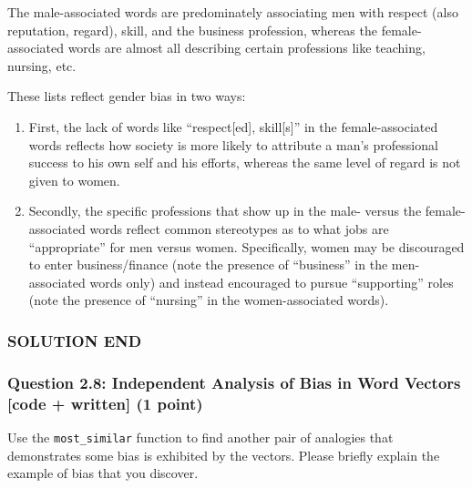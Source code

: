 \documentclass[11pt]{article}
\begin{document}
The male-associated words are predominately associating men with respect
(also reputation, regard), skill, and the business profession, whereas
the female-associated words are almost all describing certain
professions like teaching, nursing, etc.

These lists reflect gender bias in two ways:

\begin{enumerate}
\def\labelenumi{\arabic{enumi}.}
\item
  First, the lack of words like ``respect{[}ed{]}, skill{[}s{]}'' in the
  female-associated words reflects how society is more likely to
  attribute a man's professional success to his own self and his
  efforts, whereas the same level of regard is not given to women.
\item
  Secondly, the specific professions that show up in the male- versus
  the female-associated words reflect common stereotypes as to what jobs
  are ``appropriate'' for men versus women. Specifically, women may be
  discouraged to enter business/finance (note the presence of
  ``business'' in the men-associated words only) and instead encouraged
  to pursue ``supporting'' roles (note the presence of ``nursing'' in
  the women-associated words).
\end{enumerate}

\hypertarget{solution-end}{%
\subsubsection{SOLUTION END}\label{solution-end}}

    \hypertarget{question-2.8-independent-analysis-of-bias-in-word-vectors-code-written-1-point}{%
\subsubsection{Question 2.8: Independent Analysis of Bias in Word
Vectors {[}code + written{]} (1
point)}\label{question-2.8-independent-analysis-of-bias-in-word-vectors-code-written-1-point}}

Use the \texttt{most\_similar} function to find another pair of
analogies that demonstrates some bias is exhibited by the vectors.
Please briefly explain the example of bias that you discover.
\end{document}
